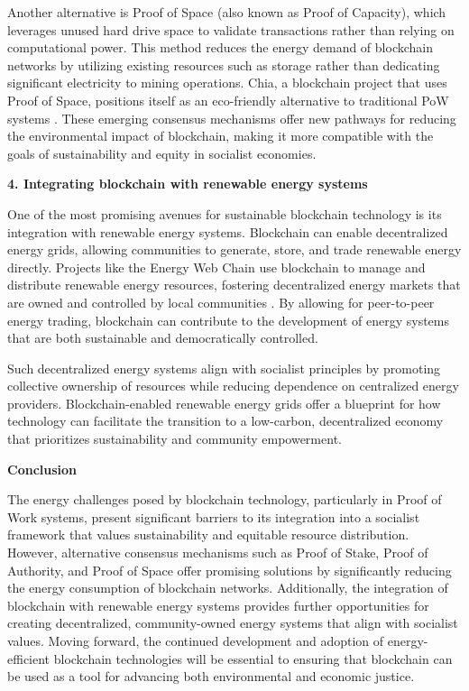 \begin{refsection}
Another alternative is Proof of Space (also known as Proof of Capacity), which leverages unused hard drive space to validate transactions rather than relying on computational power. This method reduces the energy demand of blockchain networks by utilizing existing resources such as storage rather than dedicating significant electricity to mining operations. Chia, a blockchain project that uses Proof of Space, positions itself as an eco-friendly alternative to traditional PoW systems \cite[pp.~115-117]{lipton2021}. These emerging consensus mechanisms offer new pathways for reducing the environmental impact of blockchain, making it more compatible with the goals of sustainability and equity in socialist economies.

\textbf{4. Integrating blockchain with renewable energy systems}

One of the most promising avenues for sustainable blockchain technology is its integration with renewable energy systems. Blockchain can enable decentralized energy grids, allowing communities to generate, store, and trade renewable energy directly. Projects like the Energy Web Chain use blockchain to manage and distribute renewable energy resources, fostering decentralized energy markets that are owned and controlled by local communities \cite[pp.~98-101]{schneider2018}. By allowing for peer-to-peer energy trading, blockchain can contribute to the development of energy systems that are both sustainable and democratically controlled.

Such decentralized energy systems align with socialist principles by promoting collective ownership of resources while reducing dependence on centralized energy providers. Blockchain-enabled renewable energy grids offer a blueprint for how technology can facilitate the transition to a low-carbon, decentralized economy that prioritizes sustainability and community empowerment.

\textbf{Conclusion}

The energy challenges posed by blockchain technology, particularly in Proof of Work systems, present significant barriers to its integration into a socialist framework that values sustainability and equitable resource distribution. However, alternative consensus mechanisms such as Proof of Stake, Proof of Authority, and Proof of Space offer promising solutions by significantly reducing the energy consumption of blockchain networks. Additionally, the integration of blockchain with renewable energy systems provides further opportunities for creating decentralized, community-owned energy systems that align with socialist values. Moving forward, the continued development and adoption of energy-efficient blockchain technologies will be essential to ensuring that blockchain can be used as a tool for advancing both environmental and economic justice.


\end{refsection}
